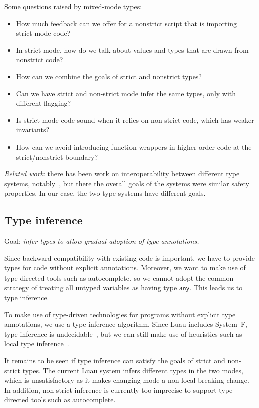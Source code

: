 \documentclass[acmsmall]{acmart}
\newcommand{\ANY}{\mathsf{any}}
\begin{document}
Some questions raised by mixed-mode types:
\begin{itemize}

\item How much feedback can we offer for a nonstrict script that is
  importing strict-mode code?

\item In strict mode, how do we talk about values and types that are
  drawn from nonstrict code?

\item How can we combine the goals of strict and nonstrict types?

\item Can we have strict and non-strict mode infer the same types,
  only with different flagging?

\item Is strict-mode code sound when it relies on non-strict code,
  which has weaker invariants?

\item How can we avoid introducing function wrappers in higher-order code
  at the strict/nonstrict boundary?

\end{itemize}
\emph{Related work}: there has been work on interoperability between different type systems,
notably~\cite{LinkingTypes}, but there the overall goals of the systems were similar safety properties.
In our case, the two type systems have different goals.

\subsection{Type inference}

Goal: \emph{infer types to allow gradual adoption of type annotations.}

Since backward compatibility with existing code is important, we have
to provide types for code without explicit annotations. Moreover, we
want to make use of type-directed tools such as autocomplete, so we
cannot adopt the common strategy of treating all untyped variables as
having type $\ANY$. This leads us to type inference.

To make use of type-driven technologies for programs
without explicit type annotations, we use a type inference algorithm.
Since Luau includes System~F, type inference is undecidable~\cite{Boehm85},
but we can still make use of heuristics such as local type inference~\cite{LocalTypeInference}.

It remains to be seen if type inference can satisfy the goals of
strict and non-strict types. The current Luau system
infers different types in the two modes, which is unsatisfactory as it
makes changing mode a non-local breaking change. In addition,
non-strict inference is currently too imprecise to support
type-directed tools such as autocomplete.
\end{document}
